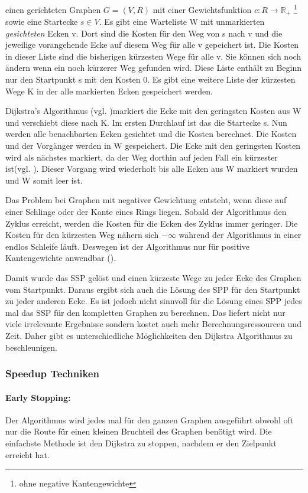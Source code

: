 \documentclass[12pt,a4paper]{article}
\begin{document}
 einen gerichteten Graphen $G = (V,R)$ mit einer Gewichtsfunktion $c: R \rightarrow \mathbb{R}_{+}$ \footnote{ohne negative Kantengewichte} sowie eine Startecke $s \in V$. Es gibt eine Warteliste W mit unmarkierten \textit{gesichteten} Ecken v. Dort sind die Kosten für den Weg von s nach v und die jeweilige vorangehende Ecke auf diesem Weg für alle v gepeichert ist. Die Kosten in dieser Liste sind die bisherigen kürzesten Wege für alle v. Sie können sich noch ändern wenn ein noch kürzerer Weg gefunden wird. Diese Liste enthält zu Beginn nur den Startpunkt s mit den Kosten 0. Es gibt eine weitere Liste der kürzesten Wege K in der alle markierten Ecken gespeichert werden.

Dijkstra's Algorithmus (vgl. \cite{dijkstra})markiert die Ecke mit den geringsten Kosten aus W und verschiebt diese nach K. Im ersten Durchlauf ist das die Startecke s. Nun werden alle benachbarten Ecken gesichtet und die Kosten berechnet. Die Kosten und der Vorgänger werden in W gespeichert. Die Ecke mit den geringsten Kosten wird als nächstes markiert, da der Weg dorthin auf jeden Fall ein kürzester ist(vgl. \cite[197f]{kurt}).  Dieser Vorgang wird wiederholt bis alle Ecken aus W markiert wurden und W somit leer ist.

Das Problem bei Graphen mit negativer Gewichtung entsteht, wenn diese auf einer Schlinge oder der Kante eines Rings liegen. Sobald der Algorithmus den Zyklus erreicht, werden die Kosten für die Ecken des Zyklus immer geringer. Die Kosten für den kürzesten Weg nähern sich $-\infty $ während der Algorithmus in einer endlos Schleife läuft. Deswegen ist der Algorithmus nur für positive Kantengewichte anwendbar (\cite[194f]{kurt}).

Damit wurde das SSP gelöst und einen kürzeste Wege zu jeder Ecke des Graphen vom Startpunkt. Daraus ergibt sich auch die Lösung des SPP für den Startpunkt zu jeder anderen Ecke. Es ist jedoch nicht sinnvoll für die Lösung eines SPP jedes mal das SSP für den kompletten Graphen zu berechnen. Das liefert nicht nur viele irrelevante Ergebnisse sondern kostet auch mehr Berechnungsressourcen und Zeit. Daher gibt es unterschiedliche Möglichkeiten den Dijkstra Algorithmus zu beschleunigen.

\subsubsection{Speedup Techniken}

\paragraph*{Early Stopping:}
Der Algorithmus wird jedes mal für den ganzen Graphen ausgeführt obwohl oft nur die Route für einen kleinen Bruchteil des Graphen benötigt wird. Die einfachste Methode ist den Dijkstra zu stoppen, nachdem er den Zielpunkt erreicht hat. 
\end{document}
